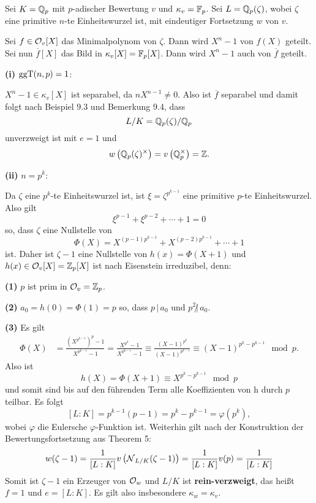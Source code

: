 \begin{Bsp}
	Sei $K=\mathbb{Q}_p$ mit $p$-adischer Bewertung $v$ und $\kappa_v = \mathbb{F}_p$.
	Sei $L=\mathbb{Q}_p(\zeta)$, wobei $\zeta$ eine primitive $n$-te Einheitswurzel ist, mit eindeutiger Fortsetzung $w$ von $v$.
	
	\bigskip
	Sei $f\in\mathcal{O}_v[X]$ das Minimalpolynom von $\zeta$. Dann wird $X^n-1$ von $f(X)$ geteilt.
	Sei nun $\overline{f}[X]$ das Bild in $\kappa_v[X] = \mathbb{F}_p[X]$. Dann wird $X^n-1$ auch von $\overline{f}$ geteilt.
	
	\bigskip
	\textbf{(i)} $\operatorname{ggT}(n,p) = 1$:
	
	$X^n-1 \in \kappa_v[X]$ ist separabel, da $nX^{n-1} \neq 0$.
	Also ist $\overline{f}$ separabel und damit folgt nach Beispiel 9.3 und Bemerkung 9.4, dass
	\[ L/ K = \mathbb{Q}_p(\zeta) / \mathbb{Q}_p
	\]
	unverzweigt ist mit $e=1$ und
	\[w \left( \mathbb{Q}_p(\zeta)^\times \right)
	=v\left(\mathbb{Q}_p^\times \right)
	=\mathbb{Z}.
	\]
	
	\bigskip \textbf{(ii)} $n=p^k$:
	
	Da $\zeta$ eine $p^k$-te Einheitswurzel ist, ist $\xi = \zeta^{p^{k-1}}$ eine primitive $p$-te Einheitswurzel. Also gilt
	\[ \xi^{p-1} + \xi^{p-2} + \cdots + 1 = 0
	\]
	so, dass $\zeta$ eine Nullstelle von
	\[ \Phi(X) = X^{(p-1)p^{k-1}} + X^{(p-2)p^{k-1}} + \cdots +1
	\]
	ist. Daher ist $\zeta-1$ eine Nullstelle von $h(x) = \Phi(X+1)$ und $h(x) \in \mathcal{O}_v[X] = \mathbb{Z}_p[X]$ ist nach Eisenstein irreduzibel, denn:
	
	\textbf{(1)} $p$ ist prim in $\mathcal{O}_v = \mathbb{Z}_p$.
	
	\textbf{(2)} $a_0 = h(0) = \Phi(1) = p$ so, dass $p \, | \, a_0$ und $p^2 \not | \,a_0$.
	
	\textbf{(3)} Es gilt
	\begin{align*}
	\Phi(X)
	&= \frac{ \left( X^{p^{k-1}} \right)^p - 1  }{ X^{p^{k-1}} - 1 }
	=\frac{{ X^{p^{k}} - 1 }}{{ X^{p^{k-1}} - 1 }}
	\equiv \frac{{ (X-1)^{p^{k}}}}{{ (X-1)^{p^{k-1}}}}
	\equiv (X-1)^{p^k-p^{k-1}}
	\mod p.
	\end{align*}
	Also ist
	\[ h(X) = \Phi(X+1) \equiv X^{p^k-p^{k-1}} \mod p
	\]
	und somit sind bis auf den führenden Term alle Koeffizienten von h durch $p$ teilbar.
	Es folgt
	\[ [L:K] = p^{k-1}(p-1) = p^k - p^{k-1} = \varphi \left(p^k \right),
	\]
	wobei $\varphi$ die Eulersche $\varphi$-Funktion ist.
	Weiterhin gilt nach der Konstruktion der Bewertungsfortsetzung aus Theorem 5:
	\[ w(\zeta-1)
	= \frac{1}{[L:K]} v \left( \operatorname{\mathcal{N}}_{L/K} ( \zeta-1) \right)
	= \frac{1}{[L:K]} v(p)
	= \frac{1}{[L:K]}
	\]
	Somit ist $\zeta -1$ ein Erzeuger von $\mathcal{O}_w$ und $L/K$ ist \textbf{rein-verzweigt}, das heißt $f=1$ und $e=[L:K]$. Es gilt also insbesondere $\kappa_w = \kappa_v$.
\end{Bsp}



